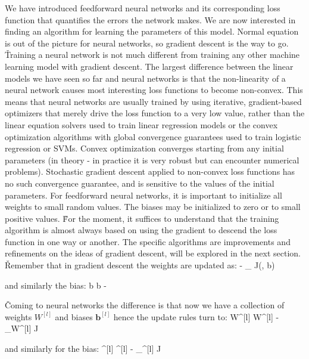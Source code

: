 We have introduced feedforward neural networks and its corresponding loss function that quantifies the errors the
network makes. We are now interested in finding an algorithm for learning the parameters of this model. Normal
equation is out of the picture for neural networks, so gradient descent is the way to go. \v

Training a neural network is not much different from training any other machine learning model with gradient descent.
The largest difference between the linear models we have seen so far and neural networks is that the non-linearity of
a neural network causes most interesting loss functions to become non-convex. This means that neural networks are
usually trained by using iterative, gradient-based optimizers that merely drive the loss function to a very low
value, rather than the linear equation solvers used to train linear regression models or the convex optimization
algorithms with global convergence guarantees used to train logistic regression or SVMs. Convex optimization
converges starting from any initial parameters (in theory - in practice it is very robust but can encounter numerical
problems). Stochastic gradient descent applied to non-convex loss functions has no such convergence guarantee, and is
sensitive to the values of the initial parameters. For feedforward neural networks, it is important to initialize all
weights to small random values. The biases may be initialized to zero or to small positive values. \v

For the moment, it suffices to understand that the training algorithm is almost always based on using the gradient to
descend the loss function in one way or another. The specific algorithms are improvements and refinements on the
ideas of gradient descent, will be explored in the next section. \v

Remember that in gradient descent the weights are updated as:
\bse
{} \coloneqq {} - \alpha \nabla_{} J(, b)
\ese

and similarly the bias:
\bse
b \coloneqq b - \alpha {}
\ese

\v

Coming to neural networks the difference is that now we have a collection of weights $W^{[l]}$ and biases
$\boldsymbol{b}^{[l]}$ hence the update rules turn to:
\bse
W^{[l]} \coloneqq W^{[l]} - \alpha \nabla_{W^{[l]}} J
\ese

and similarly for the bias:
\bse
{}^{[l]} \coloneqq {}^{[l]} - \alpha \nabla_{^{[l]}} J
\ese


